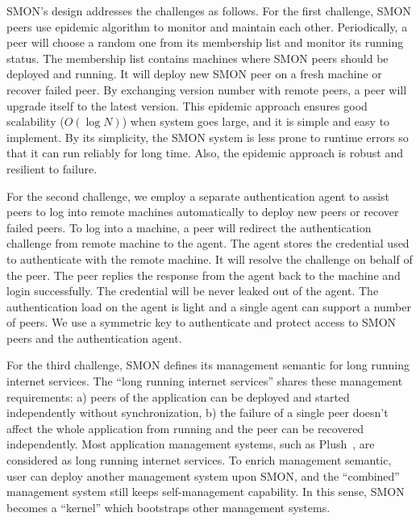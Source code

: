 SMON's design addresses the challenges as follows. For the
first challenge, SMON peers use epidemic algorithm to
monitor and maintain each other. Periodically, a peer will
choose a random one from its membership list and monitor its
running status. The membership list contains machines where
SMON peers should be deployed and running. It will deploy
new SMON peer on a fresh machine or recover failed peer. 
By exchanging version number with remote peers, a peer will
upgrade itself to the latest version.  This epidemic
approach ensures good scalability ($O(\log N)$) when system
goes large, and it is simple and easy to implement. By its
simplicity, the SMON system is less prone to runtime errors
so that it can run reliably for long time. Also, the
epidemic approach is robust and resilient to failure.


For the second challenge, we employ a separate
authentication agent to assist peers to log into remote
machines automatically to deploy new peers or recover failed
peers. To log into a machine, a peer will redirect the
authentication challenge from remote machine to the agent.
The agent stores the credential used to authenticate with
the remote machine. It will resolve the challenge on behalf
of the peer. The peer replies the response from the agent
back to the machine and login successfully. The credential
will be never leaked out of the agent. The authentication
load on the agent is light and a single agent can support a
number of peers.  We use a symmetric key to authenticate and
protect access to SMON peers and the authentication agent.

For the third challenge, SMON defines its management
semantic for long running internet services. The ``long
running internet services'' shares these management
requirements: a) peers of the application can be deployed
and started independently without synchronization, b) the
failure of a single peer doesn't affect the whole
application from running and the peer can be recovered
independently.
Most application management systems, such as
Plush~\cite{Albrecht2007},
are considered as long running internet services. To enrich
management semantic, user can deploy another management
system upon SMON, and the ``combined'' management system
still keeps self-management capability. In this sense, SMON
becomes a ``kernel'' which bootstraps other management
systems.

